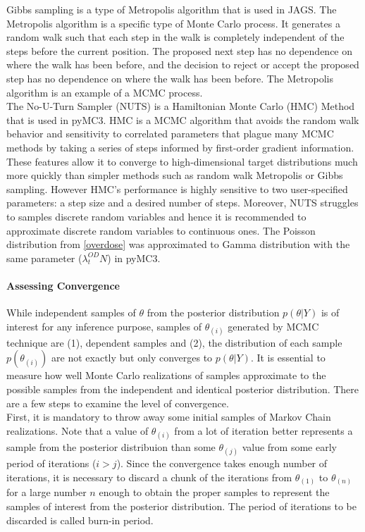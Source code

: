 \documentclass[12pt]{article}
\begin{document}
{Gibbs sampling is a type of Metropolis algorithm that is used in JAGS. The Metropolis algorithm is a specific type of Monte Carlo process. It generates a random walk such that each step in the walk is completely independent of the steps before the current position. The proposed next step has no dependence on where the walk has been before, and the decision to reject or accept the proposed step has no dependence on where the walk has been before. The Metropolis algorithm is an example of a MCMC process. \cite{doing_bayes} \\

The No-U-Turn Sampler (NUTS) is a Hamiltonian Monte Carlo (HMC) Method that is used in pyMC3. HMC is a MCMC algorithm that avoids the random walk behavior and sensitivity to correlated parameters that plague many MCMC methods by taking a series of steps informed by first-order gradient information. These features allow it to converge to high-dimensional target distributions much more quickly than simpler methods such as random walk Metropolis or Gibbs sampling. However HMC’s performance is highly sensitive to two user-specified parameters: a step size and a desired number of steps. \cite{hoffman2011nouturn} Moreover, NUTS struggles to samples discrete random variables and hence it is recommended to approximate discrete random variables to continuous ones. The Poisson distribution from \ref{overdose} was approximated to Gamma distribution with the same parameter ($\lambda_{t}^{OD}N$) in pyMC3.

\paragraph{Assessing Convergence}

While independent samples of $\theta$ from the posterior distribution $p(\theta|Y)$ is of interest for any inference purpose, samples of $\theta_{(i)}$ generated by MCMC technique are (1), dependent samples and (2), the distribution of each sample $p(\theta_{(i)})$ are not exactly but only converges to $p(\theta|Y)$. It is essential to measure how well Monte Carlo realizations of samples approximate to the possible samples from the independent and identical posterior distribution. There are a few steps to examine the level of convergence.\\

First, it is mandatory to throw away some initial samples of Markov Chain realizations. Note that a value of $\theta_{(i)}$  from a lot of iteration better represents a sample from the posterior distribuion than some $\theta_{(j)}$ value from some early period of iterations ($i > j$). Since the convergence takes enough number of iterations, it is necessary to discard a chunk of the iterations from $\theta_{(1)}$ to $\theta_{(n)}$ for a large number $n$ enough to obtain the proper samples to represent the samples of interest from the posterior distribution. The period of iterations to be discarded is called burn-in period.
\\

}
\end{document}
